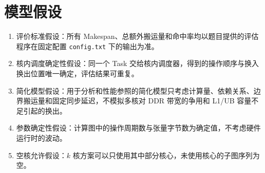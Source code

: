 \section{模型假设}

\begin{enumerate}
\item 评价标准假设：所有 Makespan、总额外搬运量和命中率均以题目提供的评估程序在固定配置 \texttt{config.txt} 下的输出为准。
\item 核内调度确定性假设：同一个 Task 交给核内调度器，得到的操作顺序与换入换出位置唯一确定，评估结果可重复。
\item 简化模型假设：用于分析和性能参照的简化模型只考虑计算量、依赖关系、边界搬运量和固定同步延迟，不模拟多核对 DDR 带宽的争用和 L1/UB 容量不足引起的换出。
\item 参数确定性假设：计算图中的操作周期数与张量字节数为确定值，不考虑硬件运行时的波动。
\item 空核允许假设：$k$ 核方案可以只使用其中部分核心，未使用核心的子图序列为空。
\end{enumerate}
